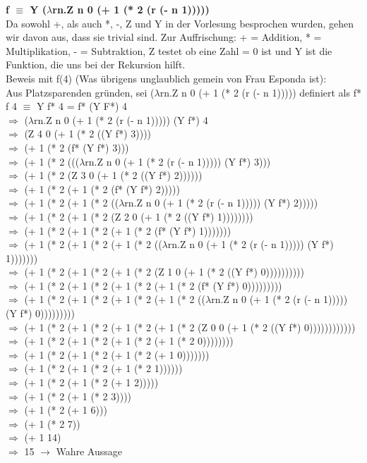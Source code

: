 \documentclass[11pt]{article}
\begin{document}
\begin{enumerate}
\textbf{f $\equiv$ Y ($\lambda$rn.Z n 0 (+ 1 (* 2 (r (- n 1)))))}\\
Da sowohl +, als auch *, -, Z und Y in der Vorlesung besprochen wurden, gehen wir davon aus, dass sie trivial sind. Zur Auffrischung: + = Addition, * = Multiplikation, - = Subtraktion, Z testet ob eine Zahl = 0 ist und Y ist die Funktion, die uns bei der Rekursion hilft.\\
Beweis mit f(4) (Was übrigens unglaublich gemein von Frau Esponda ist):\\
Aus Platzsparenden gründen, sei ($\lambda$rn.Z n 0 (+ 1 (* 2 (r (- n 1))))) definiert als f*\\
f 4 $\equiv$ Y f* 4 = f* (Y F*) 4\\
$\Rightarrow$ ($\lambda$rn.Z n 0 (+ 1 (* 2 (r (- n 1))))) (Y f*) 4\\
$\Rightarrow$ (Z 4 0 (+ 1 (* 2 ((Y f*) 3))))\\
$\Rightarrow$ (+ 1 (* 2 (f* (Y f*) 3)))\\
$\Rightarrow$ (+ 1 (* 2 ((($\lambda$rn.Z n 0 (+ 1 (* 2 (r (- n 1))))) (Y f*) 3)))\\
$\Rightarrow$ (+ 1 (* 2 (Z 3 0 (+ 1 (* 2 ((Y f*) 2))))))\\
$\Rightarrow$ (+ 1 (* 2 (+ 1 (* 2 (f* (Y f*) 2)))))\\
$\Rightarrow$ (+ 1 (* 2 (+ 1 (* 2 (($\lambda$rn.Z n 0 (+ 1 (* 2 (r (- n 1))))) (Y f*) 2)))))\\
$\Rightarrow$ (+ 1 (* 2 (+ 1 (* 2 (Z 2 0 (+ 1 (* 2 ((Y f*) 1))))))))\\
$\Rightarrow$ (+ 1 (* 2 (+ 1 (* 2 (+ 1 (* 2 (f* (Y f*) 1)))))))\\
$\Rightarrow$ (+ 1 (* 2 (+ 1 (* 2 (+ 1 (* 2 (($\lambda$rn.Z n 0 (+ 1 (* 2 (r (- n 1))))) (Y f*) 1)))))))\\
$\Rightarrow$ (+ 1 (* 2 (+ 1 (* 2 (+ 1 (* 2 (Z 1 0 (+ 1 (* 2 ((Y f*) 0))))))))))\\
$\Rightarrow$ (+ 1 (* 2 (+ 1 (* 2 (+ 1 (* 2 (+ 1 (* 2 (f* (Y f*) 0)))))))))\\
$\Rightarrow$ (+ 1 (* 2 (+ 1 (* 2 (+ 1 (* 2 (+ 1 (* 2 (($\lambda$rn.Z n 0 (+ 1 (* 2 (r (- n 1))))) (Y f*) 0)))))))))\\
$\Rightarrow$ (+ 1 (* 2 (+ 1 (* 2 (+ 1 (* 2 (+ 1 (* 2 (Z 0 0 (+ 1 (* 2 ((Y f*) 0))))))))))))
$\Rightarrow$ (+ 1 (* 2 (+ 1 (* 2 (+ 1 (* 2 (+ 1 (* 2 0))))))))\\
$\Rightarrow$ (+ 1 (* 2 (+ 1 (* 2 (+ 1 (* 2 (+ 1 0)))))))\\
$\Rightarrow$ (+ 1 (* 2 (+ 1 (* 2 (+ 1 (* 2 1))))))\\
$\Rightarrow$ (+ 1 (* 2 (+ 1 (* 2 (+ 1 2)))))\\
$\Rightarrow$ (+ 1 (* 2 (+ 1 (* 2 3))))\\
$\Rightarrow$ (+ 1 (* 2 (+ 1 6)))\\
$\Rightarrow$ (+ 1 (* 2 7))\\
$\Rightarrow$ (+ 1 14)\\
$\Rightarrow$ 15 $\rightarrow$ Wahre Aussage\\


\end{enumerate}
\end{document}
